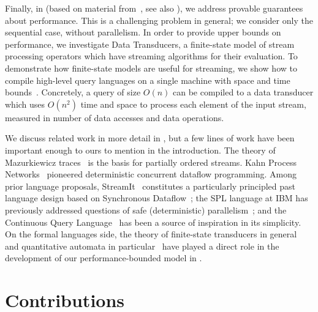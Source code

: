 Finally, in  (based on material from~, see also ), we address provable guarantees about performance. This is a challenging problem in general; we consider only the sequential case, without parallelism. In order to provide upper bounds on performance, we investigate Data Transducers, a finite-state model of stream processing operators which have streaming algorithms for their evaluation. To demonstrate how finite-state models are useful for streaming, we show how to compile high-level query languages on a single machine with space and time bounds~\cite{QRE,StreamQRE}. Concretely, a query of size $O(n)$ can be compiled to a data transducer which uses $O(n^2)$ time and space to process each element of the input stream, measured in number of data accesses and data operations.

We discuss related work in more detail in , but a few lines of work have been important enough to ours to mention in the introduction.
The theory of Mazurkiewicz traces~\cite{mazurkiewicz1986trace,DiekertR1995} is the basis for partially ordered streams.
Kahn Process Networks~\cite{gilles1974semantics} pioneered deterministic concurrent dataflow programming.
Among prior language proposals, StreamIt~\cite{thies2002streamit} constitutes a particularly principled past language design based on Synchronous Dataflow~\cite{lee1987synchronous};
the SPL language at IBM has previously addressed questions of safe (deterministic) parallelism~\cite{HAG2013SPL,schneider2013safe,hirzel2014catalog};
and the Continuous Query Language~\cite{arasu2003cql,ABW2006CQL} has been a source of inspiration in its simplicity.
On the formal languages side, the theory of finite-state transducers in general~\cite{EH2001MDST,AC2010SST}
and quantitative automata in particular~\cite{S1961WA,DKV2009HWA,AdADRY2013CRA}
have played a direct role in the development of our performance-bounded
model in .

\section{Contributions}

